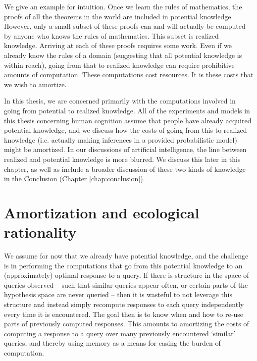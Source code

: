 We give an example for intuition. Once we learn the rules of mathematics, the proofs of all the theorems in the world are included in potential knowledge. However, only a small subset of these proofs can and will actually be computed by anyone who knows the rules of mathematics. This subset is realized knowledge. Arriving at each of these proofs requires some work. Even if we already know the rules of a domain (suggesting that all potential knowledge is within reach), going from that to realized knowledge can require prohibitive amounts of computation. These computations cost resources. It is these costs that we wish to amortize. 

In this thesis, we are concerned primarily with the computations involved in going from potential to realized knowledge. All of the experiments and models in this thesis concerning human cognition assume that people have already acquired potential knowledge, and we discuss how the costs of going from this to realized knowledge (i.e. actually making inferences in a provided probabilistic model) might be amortized. In our discussions of artificial intelligence, the line between realized and potential knowledge is more blurred. We discuss this later in this chapter, as well as include a broader discussion of these two kinds of knowledge in the Conclusion (Chapter \ref{chap:conclusion}).

\section{Amortization and ecological rationality}

We assume for now that we already have potential knowledge, and the challenge is in performing the computations that go from this potential knowledge to an (approximately) optimal response to a query. If there is structure in the space of queries observed -- such that similar queries appear often, or certain parts of the hypothesis space are never queried -- then it is wasteful to not leverage this structure and instead simply recompute responses to each query independently every time it is encountered. The goal then is to know when and how to re-use parts of previously computed responses. This amounts to amortizing the costs of computing a response to a query over many previously encountered `similar' queries, and thereby using memory as a means for easing the burden of computation.

